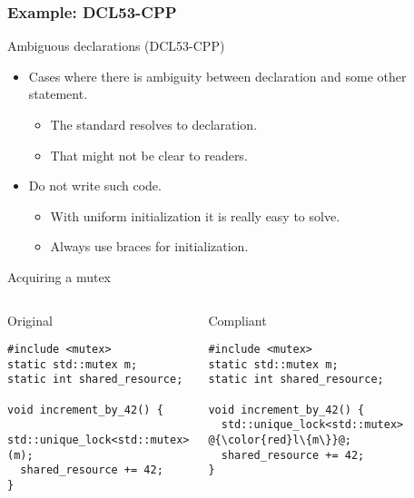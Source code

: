 \subsubsection{Example: DCL53-CPP}

\begin{frame}[t]{Ambiguous declarations (DCL53-CPP)}
\begin{itemize}
  \item Cases where there is ambiguity between declaration and some other statement.
    \begin{itemize}
      \item The standard resolves to declaration.
      \item That might not be clear to readers.
    \end{itemize}

  \vfill
  \item Do not write such code.
    \begin{itemize}
      \item With uniform initialization it is really easy to solve.
      \item Always use braces for initialization.
    \end{itemize}
\end{itemize}
\end{frame}

\begin{frame}[t,fragile]{Acquiring a mutex}
\begin{columns}

\begin{block}{Original}
\begin{lstlisting}
#include <mutex>
static std::mutex m;
static int shared_resource;

void increment_by_42() {
  std::unique_lock<std::mutex>(m);
  shared_resource += 42;
}
\end{lstlisting}
\end{block}

\pause
{}
\begin{block}{Compliant}
\begin{lstlisting}[escapechar=@]
#include <mutex>
static std::mutex m;
static int shared_resource;

void increment_by_42() {
  std::unique_lock<std::mutex> @{\color{red}l\{m\}}@;
  shared_resource += 42;
}
\end{lstlisting}
\end{block}

\end{columns}
\end{frame}

